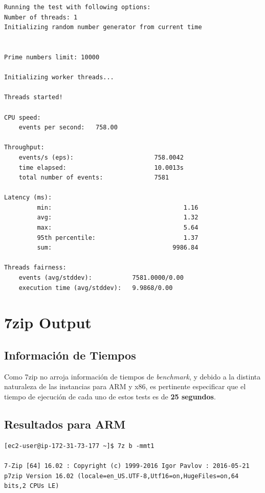 \documentclass[a4paper,openright,12pt]{article}
\begin{document}
\begin{appendices}
\begin{verbatim}
Running the test with following options:
Number of threads: 1
Initializing random number generator from current time


Prime numbers limit: 10000

Initializing worker threads...

Threads started!

CPU speed:
    events per second:   758.00

Throughput:
    events/s (eps):                      758.0042
    time elapsed:                        10.0013s
    total number of events:              7581

Latency (ms):
         min:                                    1.16
         avg:                                    1.32
         max:                                    5.64
         95th percentile:                        1.37
         sum:                                 9986.84

Threads fairness:
    events (avg/stddev):           7581.0000/0.00
    execution time (avg/stddev):   9.9868/0.00
\end{verbatim}


\newpage
\section{7zip Output}\label{anexo:7zip_output}
\subsection{Información de Tiempos}
Como 7zip no arroja información de tiempos de \emph{benchmark}, y debido a la distinta naturaleza de las instancias para ARM y x86, es pertinente especificar que el
tiempo de ejecución de cada uno de estos tests es de \textbf{25 segundos}.

\subsection{Resultados para ARM}
\begin{verbatim}
[ec2-user@ip-172-31-73-177 ~]$ 7z b -mmt1

7-Zip [64] 16.02 : Copyright (c) 1999-2016 Igor Pavlov : 2016-05-21
p7zip Version 16.02 (locale=en_US.UTF-8,Utf16=on,HugeFiles=on,64 bits,2 CPUs LE)


\end{verbatim}
\end{appendices}
\end{document}
